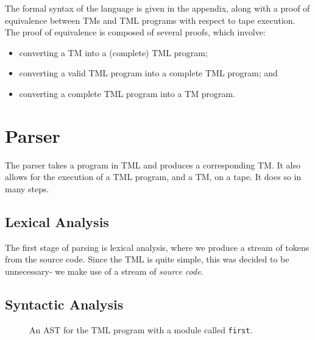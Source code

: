 The formal syntax of the language is given in the appendix, along with a proof of equivalence between TMs and TML programs with respect to tape execution. The proof of equivalence is composed of several proofs, which involve:
\begin{itemize}
    \item converting a TM into a (complete) TML program;
    \item converting a valid TML program into a complete TML program; and
    \item converting a complete TML program into a TM program.
\end{itemize}

\section{Parser}
The parser takes a program in TML and produces a corresponding TM. It also allows for the execution of a TML program, and a TM, on a tape. It does so in many steps.

\subsection{Lexical Analysis}
The first stage of parsing is lexical analysis, where we produce a stream of tokens from the source code. Since the TML is quite simple, this was decided to be unnecessary- we make use of a stream of \emph{source code}.

\subsection{Syntactic Analysis}

\begin{figure}[htb]
    \centering
    \caption{An AST for the TML program with a module called \texttt{first}.}
    \label{fig:TML_AST}
\end{figure}

